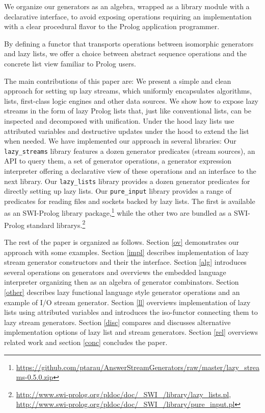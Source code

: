 \documentclass{new_tlp}
\begin{document}
We organize our generators as an algebra, wrapped as a library module with a declarative interface, to avoid exposing  operations requiring an implementation with a clear procedural flavor to the Prolog application programmer.

By defining a functor that transports operations between isomorphic
generators and lazy lists, we offer a choice between 
abstract sequence operations and the concrete list view familiar to Prolog users.



The main contributions of this paper are:
\BI
\I We present a simple and clean approach for setting up lazy streams, which
   uniformly encapsulates algorithms, lists, first-class logic engines and other data sources.
\I We show how to expose lazy streams in the form of lazy Prolog lists
   that, just like conventional lists, can be inspected and decomposed with unification.
   Under the hood lazy lists use attributed variables and destructive updates under the hood to
   extend the list when needed.
\I We have implemented our approach in several libraries:
   \BE 
   \I Our \texttt{lazy\_streams} library
features a dozen generator predicates (stream sources), an API to query
them, a set of generator  operations, a generator expression interpreter
offering a declarative view of these operations and an interface to
the next library. 
   \I Our \texttt{lazy\_lists} library provides a dozen generator predicates for 
      directly setting up lazy lists.
   \I Our \texttt{pure\_input} library provides a range of predicates for reading
      files and sockets backed by lazy lists.
   \EE
   The first is available as an SWI-Prolog
library package,\footnote{%
\url{https://github.com/ptarau/AnswerStreamGenerators/raw/master/lazy_streams-0.5.0.zip}}
  while the other two are bundled as a SWI-Prolog standard librarys.\footnote{%
\url{http://www.swi-prolog.org/pldoc/doc/_SWI_/library/lazy_lists.pl},
\url{http://www.swi-prolog.org/pldoc/doc/_SWI_/library/pure_input.pl}}
\EI

The rest of the paper is organized as follows.
Section \ref{ov} demonstrates our approach with some examples.
Section \ref{impl} describes implementation of lazy stream generator constructors and 
their the interface.
Section \ref{alg} introduces several operations on generators and overviews the
embedded language interpreter organizing then as an algebra of generator combinators.
Section \ref{other} describes lazy functional language style generator operations
and an example of I/O stream generator.
Section \ref{ll} overviews implementation of lazy lists using attributed variables
and introduces the iso-functor connecting them to  lazy stream generators.
Section \ref{disc} compares and discusses alternative implementation options of lazy list and stream generators.
Section \ref{rel} overviews related work and
section \ref{conc} concludes the paper.
\end{document}
